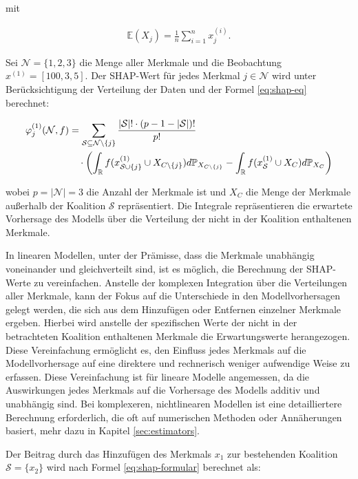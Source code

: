 mit 

\begin{align}
    \label{eq:e}
    \mathbb{E}(X_j) = \frac{1}{n} \sum_{i=1}^{n} x_j^{(i)}.
\end{align}     

Sei $\mathcal{N} = \{1, 2, 3\}$ die Menge aller Merkmale und die Beobachtung $x^{(1)} = [100, 3, 5]$. 
Der SHAP-Wert für jedes Merkmal $j \in \mathcal{N}$ wird unter Berücksichtigung der Verteilung der 
Daten und der Formel \ref{eq:shap-eq} berechnet:

\begin{align}
    \label{eq:shap-formular}
    \varphi^{(1)}_{j} (\mathcal{N}, f) &= \sum_{\mathcal{S} \subseteq \mathcal{N} \setminus \{j\}} \frac{|\mathcal{S}|! \cdot (p - 1 - |\mathcal{S}|)!}{p!} \\ \notag
    &\quad \cdot \left( \int_{\mathbb{R}} f(x^{(1)}_{\mathcal{S} \cup \{j\}} \cup X_{C \setminus \{j\}}) d\mathbb{P}_{X_{C \setminus \{j\}}} -
    \int_{\mathbb{R}} f(x^{(1)}_{\mathcal{S}} \cup X_{C}) d\mathbb{P}_{X_{C}} \right) 
\end{align}

wobei $p = |\mathcal{N}| = 3$ die Anzahl der Merkmale ist und $X_C$ die Menge der Merkmale 
außerhalb der Koalition $\mathcal{S}$ repräsentiert. Die Integrale repräsentieren die erwartete 
Vorhersage des Modells über die Verteilung der nicht in der Koalition enthaltenen Merkmale.

In linearen Modellen, unter der Prämisse, dass die Merkmale unabhängig voneinander und gleichverteilt sind, 
ist es möglich, die Berechnung der SHAP-Werte zu vereinfachen. Anstelle der komplexen Integration 
über die Verteilungen aller Merkmale, kann der Fokus auf die Unterschiede in den Modellvorhersagen gelegt werden, 
die sich aus dem Hinzufügen oder Entfernen einzelner Merkmale ergeben. 
Hierbei wird anstelle der spezifischen Werte der nicht in der betrachteten Koalition enthaltenen Merkmale 
die Erwartungswerte herangezogen. Diese Vereinfachung ermöglicht es, den Einfluss jedes Merkmals auf 
die Modellvorhersage auf eine direktere und rechnerisch weniger aufwendige Weise zu erfassen.
Diese Vereinfachung ist für lineare Modelle angemessen, da die Auswirkungen jedes Merkmals 
auf die Vorhersage des Modells additiv und unabhängig sind. Bei komplexeren, 
nichtlinearen Modellen ist eine detailliertere Berechnung erforderlich, 
die oft auf numerischen Methoden oder Annäherungen basiert, mehr dazu in Kapitel \ref{sec:estimators}.

Der Beitrag durch das Hinzufügen des Merkmals $x_1$ zur bestehenden Koalition $\mathcal{S} = \{x_2\}$ wird
nach Formel \ref{eq:shap-formular} berechnet als:


